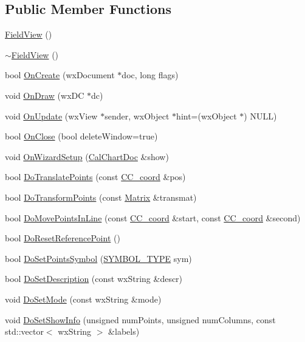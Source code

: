 \subsection*{Public Member Functions}
\begin{DoxyCompactItemize}
\item 
\hyperlink{a00103_a9445858df3bc41cd26ada88ab7560f24}{Field\-View} ()
\item 
\hyperlink{a00103_a4351f8deee378e5f009558c4e71bb42a}{$\sim$\-Field\-View} ()
\item 
bool \hyperlink{a00103_a3da730602d1f73b0b9a0e569bd1d8a9b}{On\-Create} (wx\-Document $\ast$doc, long flags)
\item 
void \hyperlink{a00103_a637b2b66f4fffe7a9ffa7337453ec8e0}{On\-Draw} (wx\-D\-C $\ast$dc)
\item 
void \hyperlink{a00103_a09a62e03b8c706644866420fd966b0fe}{On\-Update} (wx\-View $\ast$sender, wx\-Object $\ast$hint=(wx\-Object $\ast$) N\-U\-L\-L)
\item 
bool \hyperlink{a00103_aba55681a0fdcf61d2de774f37133f6ce}{On\-Close} (bool delete\-Window=true)
\item 
void \hyperlink{a00103_ae98e03fc84d286dcc96a1c82de066834}{On\-Wizard\-Setup} (\hyperlink{a00020}{Cal\-Chart\-Doc} \&show)
\item 
bool \hyperlink{a00103_a205d17d30f799b288291b6adce38ccd7}{Do\-Translate\-Points} (const \hyperlink{a00029}{C\-C\-\_\-coord} \&pos)
\item 
bool \hyperlink{a00103_a7fd82a74ea62496299ccddef768f09da}{Do\-Transform\-Points} (const \hyperlink{a00111}{Matrix} \&transmat)
\item 
bool \hyperlink{a00103_a3824075742502fa702509988083bf41d}{Do\-Move\-Points\-In\-Line} (const \hyperlink{a00029}{C\-C\-\_\-coord} \&start, const \hyperlink{a00029}{C\-C\-\_\-coord} \&second)
\item 
bool \hyperlink{a00103_ac1a4b537b9f36dc320400b358f99e8bf}{Do\-Reset\-Reference\-Point} ()
\item 
bool \hyperlink{a00103_af81e382d6fb4f801d2ea056354f25869}{Do\-Set\-Points\-Symbol} (\hyperlink{a00216_a68cd84e0300be6f9ff4474682762c9ee}{S\-Y\-M\-B\-O\-L\-\_\-\-T\-Y\-P\-E} sym)
\item 
bool \hyperlink{a00103_acaa362ca278e70d5f428898abe5705f1}{Do\-Set\-Description} (const wx\-String \&descr)
\item 
void \hyperlink{a00103_a6c55ba95a94eed0c46cf79db3ff3e9e4}{Do\-Set\-Mode} (const wx\-String \&mode)
\item 
void \hyperlink{a00103_acc72a468ce3e6805f4fbfbc20d6c165c}{Do\-Set\-Show\-Info} (unsigned num\-Points, unsigned num\-Columns, const std\-::vector$<$ wx\-String $>$ \&labels)

\end{DoxyCompactItemize}
